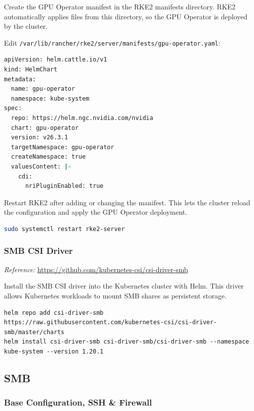 \documentclass{article}
\begin{document}
Create the GPU Operator manifest in the RKE2 manifests directory. RKE2 automatically applies files from this directory, so the GPU Operator is deployed by the cluster.

\vspace{0.5cm}

Edit \texttt{/var/lib/rancher/rke2/server/manifests/gpu-operator.yaml}:
\begin{lstlisting}[language=sh]
apiVersion: helm.cattle.io/v1
kind: HelmChart
metadata:
  name: gpu-operator
  namespace: kube-system
spec:
  repo: https://helm.ngc.nvidia.com/nvidia
  chart: gpu-operator
  version: v26.3.1
  targetNamespace: gpu-operator
  createNamespace: true
  valuesContent: |-
    cdi:
      nriPluginEnabled: true
\end{lstlisting}

Restart RKE2 after adding or changing the manifest. This lets the cluster reload the configuration and apply the GPU Operator deployment.

\begin{lstlisting}[language=sh]
sudo systemctl restart rke2-server
\end{lstlisting}

\vspace{0.4cm}
\subsubsection{SMB CSI Driver}
\noindent\textit{Reference:} \url{https://github.com/kubernetes-csi/csi-driver-smb}\par\vspace{0.4cm}

Install the SMB CSI driver into the Kubernetes cluster with Helm. This driver allows Kubernetes workloads to mount SMB shares as persistent storage.

\begin{lstlisting}
helm repo add csi-driver-smb https://raw.githubusercontent.com/kubernetes-csi/csi-driver-smb/master/charts
helm install csi-driver-smb csi-driver-smb/csi-driver-smb --namespace kube-system --version 1.20.1
\end{lstlisting}

\subsection{SMB}

\vspace{0.4cm}
\subsubsection{Base Configuration, SSH \& Firewall}
\end{document}
